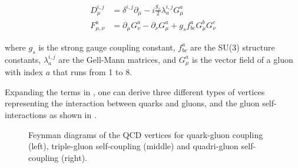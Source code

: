 \begin{equation}
  \begin{split}
    D_{\mu}^{i,j}   &= \delta^{i,j}\partial_{\mu} - i\frac{g_{s}}{2}\lambda_{a}^{i,j}G^{a}_{\mu} \\
    F^{a}_{\mu,\nu} &= \partial_{\mu}G_{\nu}^{a}-\partial_{\nu}G_{\mu}^{a}+g_{s}f^{a}_{bc}G^{b}_{\mu}G^{c}_{\nu}
  \end{split}
\end{equation}

where $g_{s}$ is the strong gauge coupling constant, $f^{a}_{bc}$ are the SU(3) structure constants, $\lambda_{a}^{i,j}$ are the Gell-Mann matrices, and $G^{a}_{\mu}$ is the vector field of a gluon with index $a$ that runs from 1 to 8.

Expanding the terms in , one can derive three different types of vertices representing the interaction between quarks and gluons, and the gluon self-interactions as shown in .

\begin{figure}[!htb]
  \vspace{10mm}
  \centering
  \hspace*{1cm}
  \hspace*{1cm}
  \vspace{1mm}
  \caption{Feynman diagrams of the QCD vertices for quark-gluon coupling (left), triple-gluon self-coupling (middle) and quadri-gluon self-coupling (right).}
  \label{dia:QCDVertices}
\end{figure}

